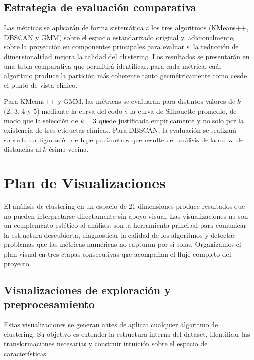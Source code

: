 \documentclass[12pt,letterpaper]{article}
\begin{document}
\subsection{Estrategia de evaluación comparativa}

Las métricas se aplicarán de forma sistemática a los tres algoritmos (K\-Means++, DBSCAN y GMM)
sobre el espacio estandarizado original y, adicionalmente, sobre la proyección en componentes
principales para evaluar si la reducción de dimensionalidad mejora la calidad del clustering. Los
resultados se presentarán en una tabla comparativa que permitirá identificar, para cada métrica,
cuál algoritmo produce la partición más coherente tanto geométricamente como desde el punto de
vista clínico.

Para K\-Means++ y GMM, las métricas se evaluarán para distintos valores de $k$ (2, 3, 4 y 5)
mediante la curva del codo y la curva de Silhouette promedio, de modo que la selección de $k = 3$
quede justificada empíricamente y no solo por la existencia de tres etiquetas clínicas. Para
DBSCAN, la evaluación se realizará sobre la configuración de hiperparámetros que resulte del
análisis de la curva de distancias al $k$-ésimo vecino.

\section{Plan de Visualizaciones}

El análisis de clustering en un espacio de 21 dimensiones produce resultados que no pueden
interpretarse directamente sin apoyo visual. Las visualizaciones no son un complemento estético al
análisis: son la herramienta principal para comunicar la estructura descubierta, diagnosticar la
calidad de los algoritmos y detectar problemas que las métricas numéricas no capturan por sí solas.
Organizamos el plan visual en tres etapas consecutivas que acompañan el flujo completo del
proyecto.

\subsection{Visualizaciones de exploración y preprocesamiento}

Estas visualizaciones se generan antes de aplicar cualquier algoritmo de clustering. Su objetivo
es entender la estructura interna del dataset, identificar las transformaciones necesarias y
construir intuición sobre el espacio de características.
\end{document}
